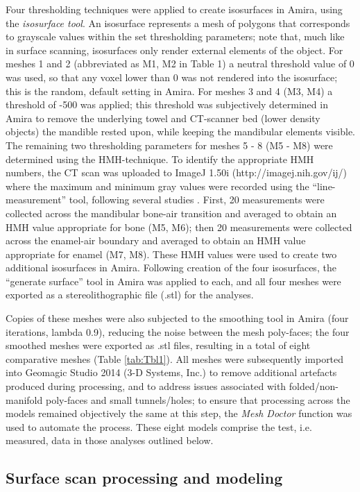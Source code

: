\documentclass[review]{elsarticle}
\begin{document}
Four thresholding techniques were applied to create isosurfaces in Amira, using the \textit{isosurface tool}. An isosurface represents a mesh of polygons that corresponds to grayscale values within the set thresholding parameters; note that, much like in surface scanning, isosurfaces only render external elements of the object. For meshes 1 and 2 (abbreviated as M1, M2 in Table 1) a neutral threshold value of 0 was used, so that any voxel lower than 0 was not rendered into the isosurface; this is the random, default setting in Amira. For meshes 3 and 4 (M3, M4) a threshold of -500 was applied; this threshold was subjectively determined in Amira to remove the underlying towel and CT-scanner bed (lower density objects) the mandible rested upon, while keeping the mandibular elements visible. The remaining two thresholding parameters for meshes 5 - 8 (M5 - M8) were determined using the HMH-technique. To identify the appropriate HMH numbers, the CT scan was uploaded to ImageJ 1.50i  (http://imagej.nih.gov/ij/) where the maximum and minimum gray values were recorded using the “line-measurement” tool, following several studies \citep{RN5883,RN5882}. First, 20 measurements were collected across the mandibular bone-air transition and averaged to obtain an HMH value appropriate for bone (M5, M6); then 20 measurements were collected across the enamel-air boundary and averaged to obtain an HMH value appropriate for enamel (M7, M8). These HMH values were used to create two additional isosurfaces in Amira. Following creation of the four isosurfaces, the “generate surface” tool in Amira was applied to each, and all four meshes were exported as a stereolithographic file (.stl) for the analyses. 

Copies of these meshes were also subjected to the smoothing tool in Amira (four iterations, lambda 0.9), reducing the noise between the mesh poly-faces; the four smoothed meshes were exported as .stl files, resulting in a total of eight comparative meshes (Table \ref{tab:Tbl1}). All meshes were subsequently imported into Geomagic Studio 2014 (3-D Systems, Inc.) to remove additional artefacts produced during processing, and to address issues associated with folded/non-manifold poly-faces and small tunnels/holes; to ensure that processing across the models remained objectively the same at this step, the \textit{Mesh Doctor} function was used to automate the process. These eight models comprise the test, i.e. measured, data in those analyses outlined below. 

\subsection{Surface scan processing and modeling}
\end{document}
